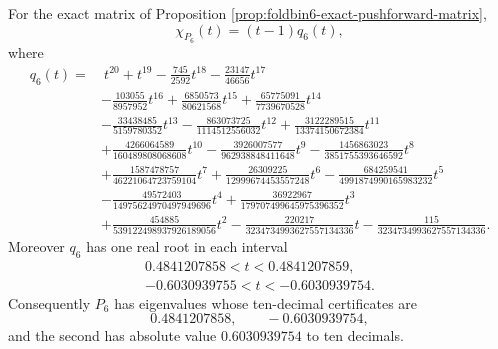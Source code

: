 \begin{lemma}\label{lem:foldbin6-characteristic-certificate}
For the exact matrix of Proposition \ref{prop:foldbin6-exact-pushforward-matrix},
\[
\chi_{P_6}(t)=(t-1)q_6(t),
\]
where
{\small
\[
\begin{aligned}
q_6(t)=&\ t^{20}+t^{19}-\frac{745}{2592}t^{18}
-\frac{23147}{46656}t^{17}\\
&-\frac{103055}{8957952}t^{16}+\frac{6850573}{80621568}t^{15}
+\frac{65775091}{7739670528}t^{14}\\
&-\frac{33438485}{5159780352}t^{13}
-\frac{863073725}{1114512556032}t^{12}
+\frac{3122289515}{13374150672384}t^{11}\\
&+\frac{4266064589}{160489808068608}t^{10}
-\frac{3926007577}{962938848411648}t^9
-\frac{1456863023}{3851755393646592}t^8\\
&+\frac{1587478757}{46221064723759104}t^7
+\frac{26309225}{12999674453557248}t^6
-\frac{684259541}{4991874990165983232}t^5\\
&-\frac{49572403}{14975624970497949696}t^4
+\frac{36922967}{179707499645975396352}t^3\\
&+\frac{454885}{539122498937926189056}t^2
-\frac{220217}{3234734993627557134336}t
-\frac{115}{3234734993627557134336}.
\end{aligned}
\]
}
Moreover \(q_6\) has one real root in each interval
\[
\begin{gathered}
0.4841207858<t<0.4841207859,\\
-0.6030939755<t<-0.6030939754.
\end{gathered}
\]
Consequently \(P_6\) has eigenvalues whose ten-decimal certificates are
\[
0.4841207858,
\qquad
-0.6030939754,
\]
and the second has absolute value \(0.6030939754\) to ten decimals.
\end{lemma}
